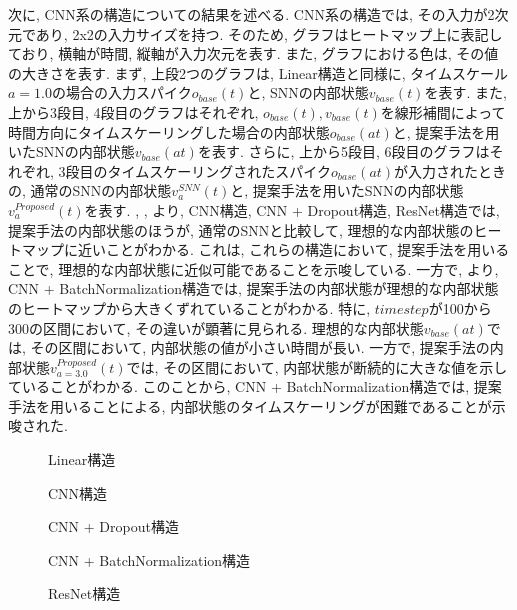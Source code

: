 次に, CNN系の構造についての結果を述べる.
CNN系の構造では, その入力が2次元であり, 2x2の入力サイズを持つ.
そのため, グラフはヒートマップ上に表記しており, 横軸が時間, 縦軸が入力次元を表す.
また, グラフにおける色は, その値の大きさを表す.
まず, 上段2つのグラフは, Linear構造と同様に, タイムスケール$a=1.0$の場合の入力スパイク$o_{base}(t)$と, SNNの内部状態$v_{base}(t)$を表す.
また, 上から3段目, 4段目のグラフはそれぞれ, $o_{base}(t), v_{base}(t)$を線形補間によって時間方向にタイムスケーリングした場合の内部状態$o_{base}(at)$と, 提案手法を用いたSNNの内部状態$v_{base}(at)$を表す.
さらに, 上から5段目, 6段目のグラフはそれぞれ, 3段目のタイムスケーリングされたスパイク$o_{base}(at)$が入力されたときの, 通常のSNNの内部状態$v_a^{SNN}(t)$と, 提案手法を用いたSNNの内部状態$v_a^{Proposed}(t)$を表す.
, , より, CNN構造, CNN + Dropout構造, ResNet構造では, 提案手法の内部状態のほうが, 通常のSNNと比較して, 理想的な内部状態のヒートマップに近いことがわかる.
これは, これらの構造において, 提案手法を用いることで, 理想的な内部状態に近似可能であることを示唆している.
一方で, より, CNN + BatchNormalization構造では, 提案手法の内部状態が理想的な内部状態のヒートマップから大きくずれていることがわかる.
特に, $timestep$が100から300の区間において, その違いが顕著に見られる.
理想的な内部状態$v_{base}(at)$では, その区間において, 内部状態の値が小さい時間が長い.
一方で, 提案手法の内部状態$v_{a=3.0}^{Proposed}(t)$では, その区間において, 内部状態が断続的に大きな値を示していることがわかる.
このことから, CNN + BatchNormalization構造では, 提案手法を用いることによる, 内部状態のタイムスケーリングが困難であることが示唆された.
\begin{figure}[htb]
    \centering
    
    \caption{Linear構造}
    \label{fig:result1:2:linear}
\end{figure}

\begin{figure}[htb]
    \centering
    
    \caption{CNN構造}
    \label{fig:result1:2:cnn}
\end{figure}

\begin{figure}[htb]
    \centering
    
    \caption{CNN + Dropout構造}
    \label{fig:result1:2:cnn:dropout}
\end{figure}

\begin{figure}[htb]
    \centering
    
    \caption{CNN + BatchNormalization構造}
    \label{fig:result1:2:cnn:batchnormalization}
\end{figure}

\begin{figure}[htb]
    \centering
    
    \caption{ResNet構造}
    \label{fig:result1:2:resnet}
\end{figure}

\clearpage
